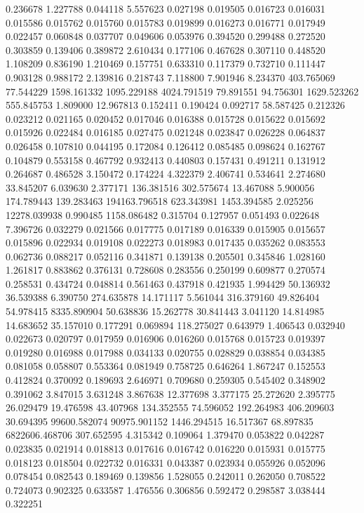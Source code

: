 0.236678
1.227788
0.044118
5.557623
0.027198
0.019505
0.016723
0.016031
0.015586
0.015762
0.015760
0.015783
0.019899
0.016273
0.016771
0.017949
0.022457
0.060848
0.037707
0.049606
0.053976
0.394520
0.299488
0.272520
0.303859
0.139406
0.389872
2.610434
0.177106
0.467628
0.307110
0.448520
1.108209
0.836190
1.210469
0.157751
0.633310
0.117379
0.732710
0.111447
0.903128
0.988172
2.139816
0.218743
7.118800
7.901946
8.234370
403.765069
77.544229
1598.161332
1095.229188
4024.791519
79.891551
94.756301
1629.523262
555.845753
1.809000
12.967813
0.152411
0.190424
0.092717
58.587425
0.212326
0.023212
0.021165
0.020452
0.017046
0.016388
0.015728
0.015622
0.015692
0.015926
0.022484
0.016185
0.027475
0.021248
0.023847
0.026228
0.064837
0.026458
0.107810
0.044195
0.172084
0.126412
0.085485
0.098624
0.162767
0.104879
0.553158
0.467792
0.932413
0.440803
0.157431
0.491211
0.131912
0.264687
0.486528
3.150472
0.174224
4.322379
2.406741
0.534641
2.274680
33.845207
6.039630
2.377171
136.381516
302.575674
13.467088
5.900056
174.789443
139.283463
194163.796518
623.343981
1453.394585
2.025256
12278.039938
0.990485
1158.086482
0.315704
0.127957
0.051493
0.022648
7.396726
0.032279
0.021566
0.017775
0.017189
0.016339
0.015905
0.015657
0.015896
0.022934
0.019108
0.022273
0.018983
0.017435
0.035262
0.083553
0.062736
0.088217
0.052116
0.341871
0.139138
0.205501
0.345846
1.028160
1.261817
0.883862
0.376131
0.728608
0.283556
0.250199
0.609877
0.270574
0.258531
0.434724
0.048814
0.561463
0.437918
0.421935
1.994429
50.136932
36.539388
6.390750
274.635878
14.171117
5.561044
316.379160
49.826404
54.978415
8335.890904
50.638836
15.262778
30.841443
3.041120
14.814985
14.683652
35.157010
0.177291
0.069894
118.275027
0.643979
1.406543
0.032940
0.022673
0.020797
0.017959
0.016906
0.016260
0.015768
0.015723
0.019397
0.019280
0.016988
0.017988
0.034133
0.020755
0.028829
0.038854
0.034385
0.081058
0.058807
0.553364
0.081949
0.758725
0.646264
1.867247
0.152553
0.412824
0.370092
0.189693
2.646971
0.709680
0.259305
0.545402
0.348902
0.391062
3.847015
3.631248
3.867638
12.377698
3.377175
25.272620
2.395775
26.029479
19.476598
43.407968
134.352555
74.596052
192.264983
406.209603
30.694395
99600.582074
90975.901152
1446.294515
16.517367
68.897835
6822606.468706
307.652595
4.315342
0.109064
1.379470
0.053822
0.042287
0.023835
0.021914
0.018813
0.017616
0.016742
0.016220
0.015931
0.015775
0.018123
0.018504
0.022732
0.016331
0.043387
0.023934
0.055926
0.052096
0.078454
0.082543
0.189469
0.139856
1.528055
0.242011
0.262050
0.708522
0.724073
0.902325
0.633587
1.476556
0.306856
0.592472
0.298587
3.038444
0.322251
